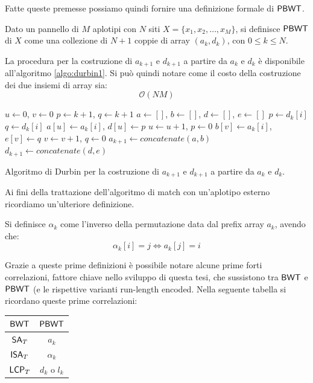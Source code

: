 \noindent
Fatte queste premesse possiamo quindi fornire una definizione formale di
$\mbox{\rm {\sf PBWT}}$.
\begin{definizione}
  Dato un pannello di $M$ aplotipi con $N$
  siti $X=\{x_1,x_2,\ldots,x_M\}$, si definisce $\mbox{\rm {\sf PBWT}}$ di $X$ come una
  collezione di $N+1$ coppie di array $(a_k,d_k)$, con $0\leq k\leq N$.
\end{definizione}
La procedura per la costruzione di $a_{k+1}$ e $d_{k+1}$ a partire da $a_k$ e
$d_k$ è disponibile all'algoritmo \ref{algo:durbin1}. Si può quindi notare come
il costo della costruzione dei due insiemi di array sia:
\begin{equation}
  \label{eq:pbwtadtime}
  \mathcal{O}(NM)
\end{equation}
\begin{algorithm}
  \small
  \begin{algorithmic}[1]
    \State $u\gets 0$, $v\gets 0$
    \State $p\gets k+1$, $q\gets k+1$
    \State $a\gets []$, $b\gets []$, $d\gets []$, $e\gets []$
    \State $p\gets d_k[i]$
    \EndIf
    \State $q\gets d_k[i]$
    \EndIf
    \State $a[u]\gets a_k[i]$, $d[u]\gets p$
    \State $u\gets u+1$, $p\gets 0$
    \Else
    \State $b[v]\gets a_k[i]$, $e[v]\gets q$
    \State $v\gets v+1$, $q\gets 0$
    \EndIf
    \EndFor
    \State $a_{k+1}\gets concatenate(a,b)$
    \State $d_{k+1}\gets concatenate(d,e)$ 
    \EndFunction
  \end{algorithmic}
  \caption{Algoritmo di Durbin per la costruzione di $a_{k+1}$ e $d_{k+1}$ a
  partire da $a_{k}$ e $d_{k}$.}
  \label{algo:durbin1}
\end{algorithm}
Ai fini della trattazione dell'algoritmo di match con un'aplotipo esterno
ricordiamo un'ulteriore definizione.
\begin{definizione}
  Si definisce $\alpha_k$ come l'inverso della permutazione data dal
    prefix array $a_k$, avendo che:
  \[\alpha_k[i]=j \iff a_k[j]=i\]
\end{definizione}
Grazie a queste prime definizioni è possibile notare alcune prime forti
correlazioni, fattore chiave nello sviluppo di questa tesi, che sussistono tra
$\mbox{\rm {\sf BWT}}$ e $\mbox{\rm {\sf PBWT}}$ (e le rispettive varianti run-length
  encoded. Nella seguente tabella si ricordano queste prime correlazioni:
\begin{table}[H]
  \centering
  \begin{tabular}{c|c}
    $\mbox{\rm {\sf BWT}}$ & $\mbox{\rm {\sf PBWT}}$\\
    \hline
    $\mbox{\rm {\sf SA}}_T$ & $a_k$\\
    $\mbox{\rm {\sf ISA}}_T$ & $\alpha_k$\\
    $\mbox{\rm {\sf LCP}}_T$ & $d_k$ o $l_k$\\            
  \end{tabular}
\end{table}
